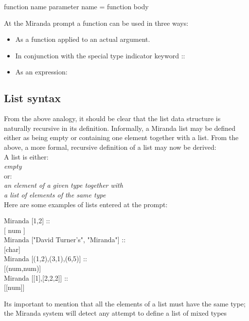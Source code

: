 \documentclass[11pt]{article}
\begin{document}
\begin{center}
function name parameter name = function body
\end{center}

At the Miranda prompt a function  can be used in three ways:\\

\begin{itemize}
\item As a function applied to an actual argument.
\item In conjunction with the special type indicator keyword ::
\item As an expression:
\end{itemize}


\subsection{List syntax}

From the above analogy, it should be clear that the list data structure is naturally
recursive in its definition. Informally, a Miranda list may be defined either as
being empty or containing one element together with a list. From the above, a more formal, recursive definition of a list may now be derived:\\


A list is either:\\
\textit{empty}\\
or:\\
\textit{an element of a given type together with\\
a list of elements of the same type}
\\

Here are some examples of lists entered at the prompt:

\begin{tcolorbox}
Miranda [1,2] ::\\
{[ num ]}\\

Miranda ["David Turner’s", "Miranda"] :: \\
{[char]} \\

Miranda [(1,2),(3,1),(6,5)] ::\\
{[(num,num)]}\\

Miranda [[1],[2,2,2]] ::\\
{[[num]]}
\end{tcolorbox}

Its important to mention that all the elements of a list must have the same type; the Miranda system will detect
any attempt to define a list of mixed types
\end{document}
